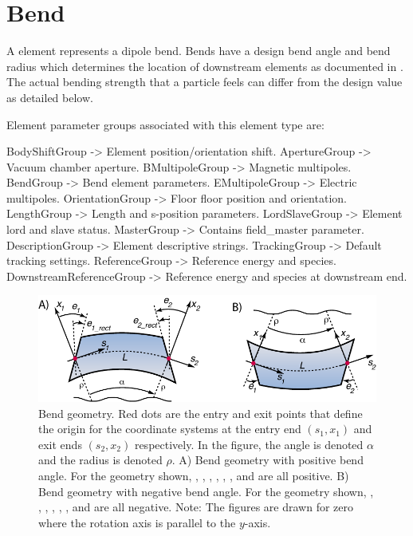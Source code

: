\newpage

\section{Bend}
\label{s:bend}

A  element represents a dipole bend. Bends have a design bend angle and bend radius
which determines the location of downstream elements as documented in .
The actual bending strength that a particle feels can differ from the design value as detailed
below.

Element parameter groups associated with this element type are:
\TOPrule
\begin{example}
  BodyShiftGroup     -> Element position/orientation shift.  
  ApertureGroup      -> Vacuum chamber aperture.  
  BMultipoleGroup    -> Magnetic multipoles.  
  BendGroup          -> Bend element parameters.  
  EMultipoleGroup    -> Electric multipoles.  
  OrientationGroup -> Floor floor position and orientation.  
  LengthGroup        -> Length and s-position parameters.  
  LordSlaveGroup     -> Element lord and slave status.  
  MasterGroup        -> Contains field_master parameter.  
  DescriptionGroup   -> Element descriptive strings.  
  TrackingGroup      -> Default tracking settings.  
  ReferenceGroup     -> Reference energy and species. 
  DownstreamReferenceGroup -> Reference energy and species at downstream end. 
\end{example}
\BOTTOMrule


\begin{figure}[ht]
  \centering \includegraphics{bend.pdf} 
\caption[Bend geometry]{
Bend geometry. Red dots are the entry and exit points that define the origin for the
coordinate systems at the entry end $(s_1, x_1)$ and exit ends $(s_2, x_2)$ respectively. 
In the figure, the angle  is denoted $\alpha$ and the radius
 is denoted $\rho$.
A) Bend geometry with positive bend angle. For the geometry shown, 
, , , , , , and  are all positive.
B) Bend geometry with negative bend angle. For the geometry shown, 
, , , , , , and  are all negative.
Note: The figures are drawn for zero  where the rotation axis is parallel to the 
$y$-axis. 
}
\label{f:bend2}
\end{figure}

